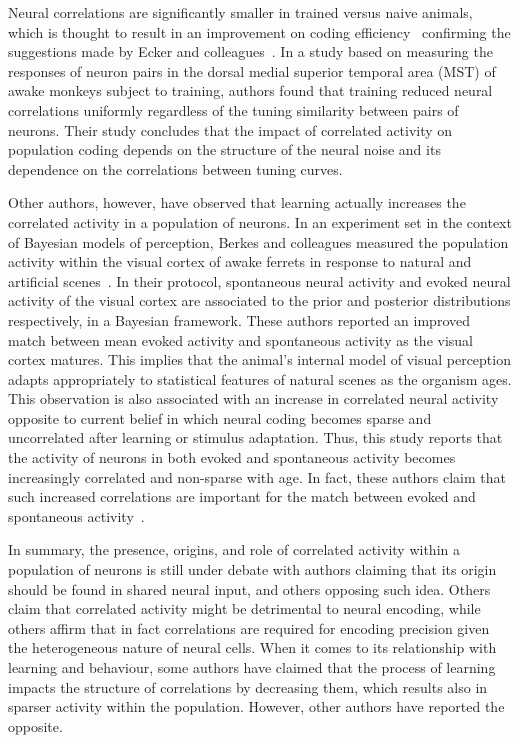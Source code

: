 \documentclass[11pt,letterpaper]{article}
\begin{document}
        Neural correlations are significantly smaller in trained versus naive animals, which is
        thought to result in an improvement on coding efficiency~\cite{gu2011perceptual} confirming
        the suggestions made by Ecker and colleagues~\cite{ecker2011effect}.
        In a study based on measuring the responses of neuron pairs in the dorsal medial superior
        temporal area (MST) of 
        awake monkeys subject to training, authors found that training reduced neural
        correlations uniformly regardless of the tuning similarity between pairs of neurons.
        Their study concludes that the impact of correlated activity on population coding depends
        on the structure of the neural noise and its dependence on the correlations between
        tuning curves.
        
        Other authors, however, have observed that learning actually increases the correlated
        activity in a population of neurons.
        In an experiment set in the context of Bayesian models of perception, Berkes and colleagues measured 
        the population
        activity within the visual cortex of awake ferrets in response to natural and artificial
        scenes~\cite{berkes2011spontaneous}.
        In their protocol, spontaneous neural activity and evoked neural activity of the visual cortex 
        are associated to the
        prior and posterior distributions respectively, in a Bayesian framework.
        These authors reported an improved match between mean evoked activity and spontaneous
        activity as the visual cortex matures. 
        This implies that the animal's internal model of visual perception 
        adapts appropriately to statistical features of natural scenes as the organism ages.
        This observation is also associated with an increase in correlated neural activity
        opposite to current belief in which neural coding becomes sparse and uncorrelated
        after learning or stimulus adaptation.
        Thus, this study reports that the activity of neurons in both evoked and spontaneous
        activity becomes increasingly correlated and non-sparse with age.
        In fact, these authors claim that such increased correlations are important for the match between 
        evoked and spontaneous activity~\cite{berkes2011spontaneous}.

        In summary, the presence, origins, and role of correlated activity within a 
        population of neurons is still under debate with authors claiming
        that its origin should be found in shared neural input, and others
        opposing such idea. Others claim that correlated activity might be
        detrimental to neural encoding, while others affirm that in fact
        correlations are required for encoding precision given the
        heterogeneous nature of neural cells.
        When it comes to its relationship with learning and behaviour,
        some authors have claimed that the process of learning impacts
        the structure of correlations by decreasing them, which results
        also in sparser activity within the population.
        However, other authors have reported the opposite.
        
\end{document}
